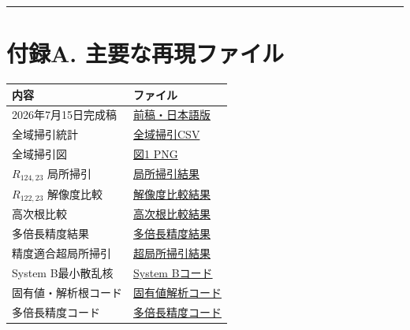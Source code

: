 \documentclass[
  10pt,
  a4paper,
]{article}
\newcounter{none} %
\begin{document}
\begin{center}\rule{0.5\linewidth}{0.5pt}\end{center}

\section{付録A.
主要な再現ファイル}\label{ux4ed8ux9332a.-ux4e3bux8981ux306aux518dux73feux30d5ux30a1ux30a4ux30eb}

{\def\LTcaptype{none} %
\begin{longtable}[]{@{}
  >{\raggedright\arraybackslash}p{}
  >{\raggedright\arraybackslash}p{}@{}}
\toprule\noalign{}
\begin{minipage}[b]{\linewidth}\raggedright
内容
\end{minipage} & \begin{minipage}[b]{\linewidth}\raggedright
ファイル
\end{minipage} \\
\midrule\noalign{}
\endhead
\bottomrule\noalign{}
\endlastfoot
2026年7月15日完成稿 &
\href{../20260715/exchange_weight_alpha_correspondence_numerical_experiment_ja.md}{前稿・日本語版} \\
全域掃引統計 &
\href{../20260715/minimal_system_B_gray_bugcheck_result_v1/direct_depth_probe_v5_sweep_control/high_to_ext_full_delta1e-7_stats_v5.csv}{全域掃引CSV} \\
全域掃引図 &
\href{../20260715/system_B_full_R_sweep_full_range_depth_v1.png}{図1
PNG} \\
\(R_{124,23}\) 局所掃引 &
\href{root_centered_delta1e-12_v1/root_centered_delta1e-12_result_v1.md}{局所掃引結果} \\
\(R_{122,23}\) 解像度比較 &
\href{R122_23_root_centered_resolution_comparison_v1/R122_23_root_centered_resolution_comparison_v1.md}{解像度比較結果} \\
高次根比較 &
\href{high_order_roots_centered_delta1e-12_v1/high_order_roots_centered_delta1e-12_result_v1.md}{高次根比較結果} \\
多倍長精度結果 &
\href{two_physical_roots_multiprecision_v1/two_physical_roots_multiprecision_result_v1.md}{多倍長精度結果} \\
精度適合超局所掃引 &
\href{two_physical_roots_precision_matched_narrow_v1/precision_matched_narrow_result_v1.md}{超局所掃引結果} \\
System B最小散乱核 &
\href{../20260715/run_minimal_system_B_gray_direct_check_v5.py}{System
Bコード} \\
固有値・解析根コード &
\href{../20260717/phase5_eigenphase_resonance_v2.py}{固有値解析コード} \\
多倍長精度コード &
\href{run_two_physical_roots_multiprecision_v1.py}{多倍長精度コード} \\
\end{longtable}
}
\end{document}
